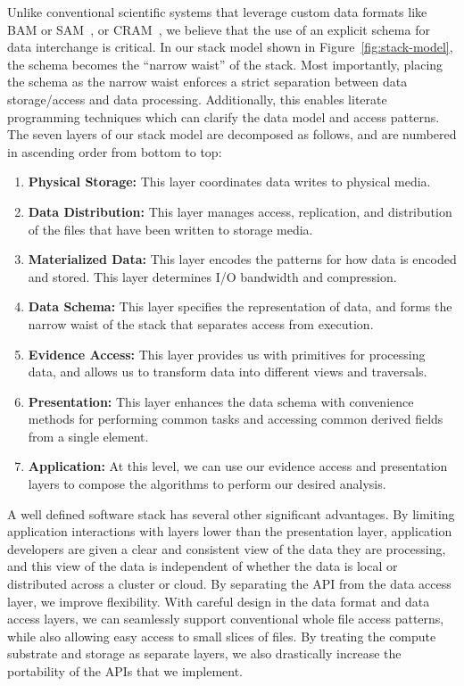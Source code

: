 \documentclass[phd]{ucbthesis}
\begin{document}
Unlike conventional scientific systems that leverage custom data formats like BAM or SAM~\cite{li09},
or CRAM~\cite{fritz11}, we believe that the use of an explicit schema for data interchange is critical.
In our stack model shown in Figure~\ref{fig:stack-model}, the schema becomes the ``narrow waist''
of the stack. Most importantly, placing the schema as the narrow waist enforces a strict separation
between data storage/access and data processing. Additionally, this enables literate programming
techniques which can clarify the data model and access patterns. The seven layers of our stack model
are decomposed as follows, and are numbered in ascending order from bottom to top:

\begin{enumerate}
\item \textbf{Physical Storage:} This layer coordinates data writes to physical media.
\item \textbf{Data Distribution:} This layer manages access, replication, and distribution of the files that have
been written to storage media.
\item \textbf{Materialized Data:} This layer encodes the patterns for how data is encoded and stored. This
layer determines I/O bandwidth and compression.
\item \textbf{Data Schema:} This layer specifies the representation of data, and forms the narrow waist of
the stack that separates access from execution.
\item \textbf{Evidence Access:} This layer provides us with primitives for processing data, and allows us to
transform data into different views and traversals.
\item \textbf{Presentation:} This layer enhances the data schema with convenience methods for performing
common tasks and accessing common derived fields from a single element.
\item \textbf{Application:} At this level, we can use our evidence access and presentation layers to compose
the algorithms to perform our desired analysis.
\end{enumerate}

A well defined software stack has several other significant advantages. By limiting application
interactions with layers lower than the presentation layer, application developers are given a clear and
consistent view of the data they are processing, and this view of the data is independent of whether the
data is local or distributed across a cluster or cloud. By separating the API from the data access layer,
we improve flexibility. With careful design in the data format and data access layers, we can seamlessly
support conventional whole file access patterns, while also allowing easy access to small slices of files.
By treating the compute substrate and storage as separate layers, we also drastically increase
the portability of the APIs that we implement.
\end{document}
